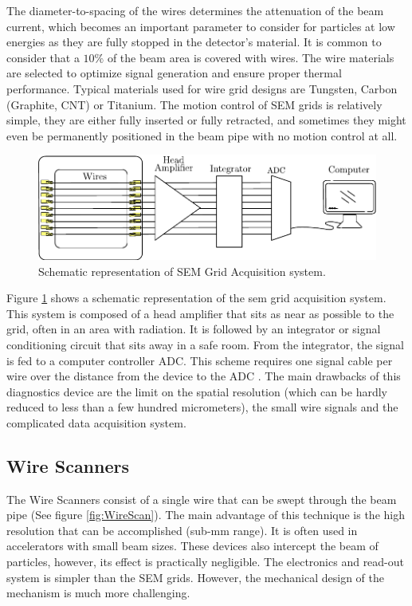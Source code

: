 The diameter-to-spacing of the wires determines the attenuation of the beam current, which becomes an important parameter to consider for particles at low energies as they are fully stopped in the detector's material. It is common to consider that a $10 \%$ of the beam area is covered with wires. The wire materials are selected to optimize signal generation and ensure proper thermal performance. Typical materials used for wire grid designs are Tungsten, Carbon (Graphite, CNT) or Titanium. The motion control of SEM grids is relatively simple, they are either fully inserted or fully retracted, and sometimes they might even be permanently positioned in the beam pipe with no motion control at all. 

\begin{figure}[h]
    \centering
    \includegraphics[width=0.9\columnwidth]{SEMgridDataADq/SEMdataAdc.pdf}
    \caption{Schematic representation of SEM Grid Acquisition system. }
    \label{fig:SEMGridReadOutSystem}
\end{figure}

Figure \ref{fig:SEMGridReadOutSystem} shows a schematic representation of the sem grid acquisition system. This system is composed of a head amplifier that sits as near as possible to the grid, often in an area with radiation. It is followed by an integrator or signal conditioning circuit that sits away in a safe room. From the integrator, the signal is fed to a computer controller ADC. This scheme requires one signal cable per wire over the distance from the device to the ADC \parencite[][]{ref:CASEnrico}. The main drawbacks of this diagnostics device are the limit on the spatial resolution (which can be hardly reduced to less than a few hundred micrometers), the small wire signals and the complicated data acquisition system. 

\subsection{Wire Scanners}
\label{sec:WireScan}

The Wire Scanners consist of a single wire that can be swept through the beam pipe (See figure \ref{fig:WireScan}). The main advantage of this technique is the high resolution that can be accomplished (sub-mm range). It is often used in accelerators with small beam sizes. These devices also intercept the beam of particles, however, its effect is practically negligible. The electronics and read-out system is simpler than the SEM grids. However, the mechanical design of the mechanism is much more challenging.

